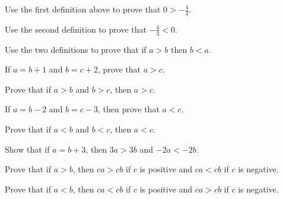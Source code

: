 \documentclass[11pt]{book}
\begin{document}
\begin{exercisecols}
\begin{exlist}
\item Use the first definition above to prove that $0 > -\frac{4}{3}$.
\item Use the second definition to prove that $-\frac{4}{3} < 0$.
\item Use the two definitions to prove that if $a > b$ then $b < a$.
\item If $a = b + 1$ and $b = c + 2$, prove that $a > c$.
\item Prove that if $a > b$ and $b > c$, then $a > c$.
\item If $a = b - 2$ and $b = c - 3$, then prove that $a < c$.
\item Prove that if $a < b$ and $b < c$, then $a < c$.
\item Show that if $a = b + 3$, then $3a > 3b$ and $-2a < -2b$.
\item Prove that if $a > b$, then $ca > cb$ if $c$ is positive and $ca < cb$ if
      $c$ is negative.
\item Prove that if $a < b$, then $ca < cb$ if $c$ is positive and $ca > cb$ if
      $c$ is negative.
\end{exlist}
\end{exercisecols}
\end{document}
